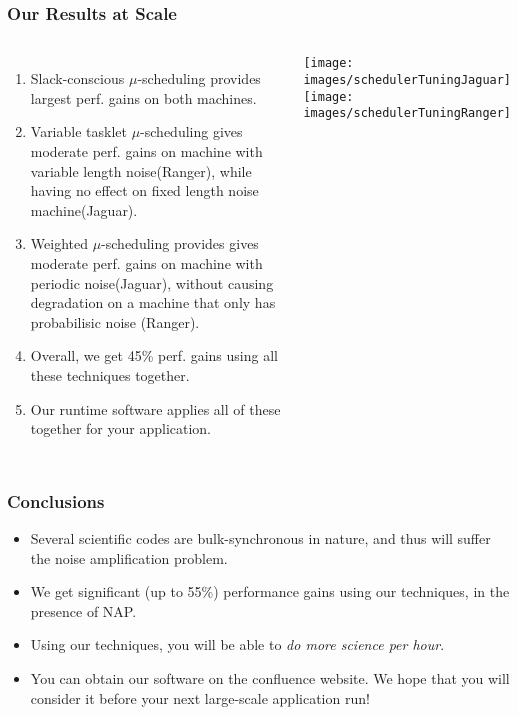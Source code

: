 \begin{frame}
\frametitle{Our Results at Scale}
\begin{columns}
  \begin{enumerate}
  \item \tiny Slack-conscious $\mu$-scheduling provides largest perf. gains on both machines.
  \item \tiny Variable tasklet $\mu$-scheduling gives moderate perf. gains on machine with variable length noise(Ranger), while having no effect on fixed length noise machine(Jaguar).
  \item \tiny Weighted $\mu$-scheduling provides gives moderate perf. gains on machine with periodic noise(Jaguar), without causing degradation on a machine that only has probabilisic noise (Ranger).
  \item \tiny Overall, we get 45\% perf. gains using all these techniques together.
  \item \tiny Our runtime software applies all of these together for your application.
  \end{enumerate}
  \texttt{[image: images/schedulerTuningJaguar]} \\
  \texttt{[image: images/schedulerTuningRanger]}
\end{columns}
\end{frame}

\begin{frame}
  \frametitle{Conclusions}
  \begin{itemize}
  \item Several scientific codes are bulk-synchronous in nature, and thus will suffer the noise amplification problem.
  \item We get significant (up to 55\%) performance gains using our techniques,  in the presence of NAP.
  \item Using our techniques, you will be able to \textit{do more science per hour}.
  \item You can obtain our software on the confluence website.  We hope that you will consider it before your next large-scale application run!
  \end{itemize}
\end{frame}
